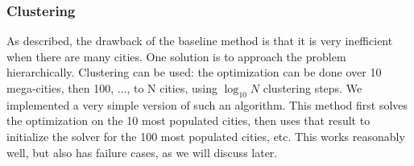 \documentclass[conference,compsoc]{IEEEtran}
\begin{document}

\subsubsection{Clustering} As described, the drawback of the baseline method is
that it is very inefficient when there are many cities. One solution is to
approach the problem hierarchically. Clustering can be used: the optimization
can be done over 10 mega-cities, then 100, ..., to N cities, using $\log_{10}N$
clustering steps. We implemented a very simple version of such an algorithm.
This method first solves the optimization on the 10 most populated cities, then
uses that result to initialize the solver for the 100 most populated cities,
etc. This works reasonably well, but also has failure cases, as we will discuss
later.

\end{document}
